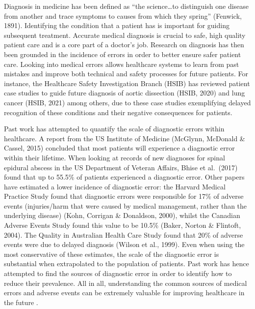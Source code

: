 \documentclass[a4paper, nobind]{templates/ociamthesis}
\begin{document}
\hfill\break
Diagnosis in medicine has been defined as ``the science\ldots to distinguish one disease from another and trace symptoms to causes from which they spring'' (Fenwick, 1891). Identifying the condition that a patient has is important for guiding subsequent treatment. Accurate medical diagnosis is crucial to safe, high quality patient care and is a core part of a doctor's job. Research on diagnosis has then been grounded in the incidence of errors in order to better ensure safer patient care. Looking into medical errors allows healthcare systems to learn from past mistakes and improve both technical and safety processes for future patients. For instance, the Healthcare Safety Investigation Branch (HSIB) has reviewed patient case studies to guide future diagnosis of aortic dissection (HSIB, 2020) and lung cancer (HSIB, 2021) among others, due to these case studies exemplifying delayed recognition of these conditions and their negative consequences for patients.

\hfill\break
Past work has attempted to quantify the scale of diagnostic errors within healthcare. A report from the US Institute of Medicine (McGlynn, McDonald \& Cassel, 2015) concluded that most patients will experience a diagnostic error within their lifetime. When looking at records of new diagnoses for spinal epidural abscess in the US Department of Veteran Affairs, Bhise et al.~(2017) found that up to 55.5\% of patients experienced a diagnostic error. Other papers have estimated a lower incidence of diagnostic error: the Harvard Medical Practice Study found that diagnostic errors were responsible for 17\% of adverse events (injuries/harm that were caused by medical management, rather than the underlying disease) (Kohn, Corrigan \& Donaldson, 2000), whilst the Canadian Adverse Events Study found this value to be 10.5\% (Baker, Norton \& Flintoft, 2004). The Quality in Australian Health Care Study found that 20\% of adverse events were due to delayed diagnosis (Wilson et al., 1999). Even when using the most conservative of these estimates, the scale of the diagnostic error is substantial when extrapolated to the population of patients. Past work has hence attempted to find the sources of diagnostic error in order to identify how to reduce their prevalence. All in all, understanding the common sources of medical errors and adverse events can be extremely valuable for improving healthcare in the future \citep{aiyer_outcomes_2023}.
\end{document}
